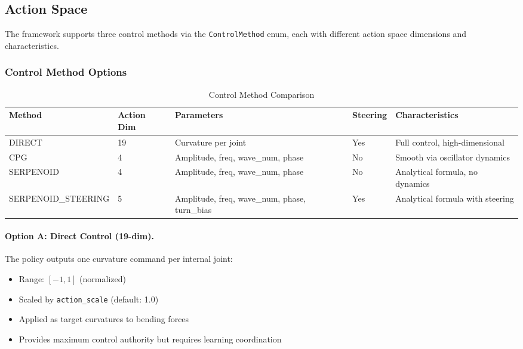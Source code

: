\documentclass[11pt]{article}
\begin{document}
\subsection{Action Space}

The framework supports three control methods via the \texttt{ControlMethod} enum, each with different action space dimensions and characteristics.

\subsubsection{Control Method Options}

\begin{table}[H]
\centering
\caption{Control Method Comparison}
\begin{tabular}{@{}lllll@{}}
\toprule
\textbf{Method} & \textbf{Action Dim} & \textbf{Parameters} & \textbf{Steering} & \textbf{Characteristics} \\
\midrule
DIRECT & 19 & Curvature per joint & Yes & Full control, high-dimensional \\
CPG & 4 & Amplitude, freq, wave\_num, phase & No & Smooth via oscillator dynamics \\
SERPENOID & 4 & Amplitude, freq, wave\_num, phase & No & Analytical formula, no dynamics \\
SERPENOID\_STEERING & 5 & Amplitude, freq, wave\_num, phase, turn\_bias & Yes & Analytical formula with steering \\
\bottomrule
\end{tabular}
\end{table}

\paragraph{Option A: Direct Control (19-dim).}
The policy outputs one curvature command per internal joint:
\begin{itemize}
    \item Range: $[-1, 1]$ (normalized)
    \item Scaled by \texttt{action\_scale} (default: 1.0)
    \item Applied as target curvatures to bending forces
    \item Provides maximum control authority but requires learning coordination
\end{itemize}
\end{document}
